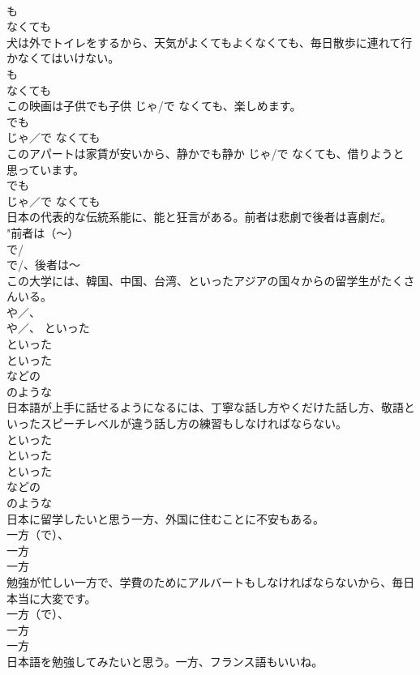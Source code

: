 \documentclass[8pt]{extreport}
\begin{document}
\begin{CJK}{UTF8}{min}
{{\\	も 
\\	なくても 
\\	犬は外でトイレをするから、天気がよくてもよくなくても、毎日散歩に連れて行かなくてはいけない。	
\\	も 
\\	なくても 
\\	この映画は子供でも子供 {じゃ/で} なくても、楽しめます。	
\\	でも 
\\	{じゃ／で} なくても 
\\	このアパートは家賃が安いから、静かでも静か {じゃ/で} なくても、借りようと思っています。	
\\	でも 
\\	{じゃ／で} なくても 
\\	日本の代表的な伝統系能に、能と狂言がある。前者は悲劇で後者は喜劇だ。	
\\	"前者は（〜）
\\	で/
\\	で/}、後者は〜 
\\	この大学には、韓国、中国、台湾、といったアジアの国々からの留学生がたくさんいる。	
\\	{や／、} 
\\	{や／、} といった 
\\	といった 
\\	といった 
\\	などの
\\	のような 
\\	日本語が上手に話せるようになるには、丁寧な話し方やくだけた話し方、敬語といったスピーチレベルが違う話し方の練習もしなければならない。	
\\	といった 
\\	といった 
\\	といった 
\\	などの
\\	のような 
\\	日本に留学したいと思う一方、外国に住むことに不安もある。	
\\	一方（で）、
\\	一方 
\\	一方 
\\	勉強が忙しい一方で、学費のためにアルバートもしなければならないから、毎日本当に大変です。	
\\	一方（で）、
\\	一方 
\\	一方 
\\	日本語を勉強してみたいと思う。一方、フランス語もいいね。	
}
\end{CJK}
\end{document}
